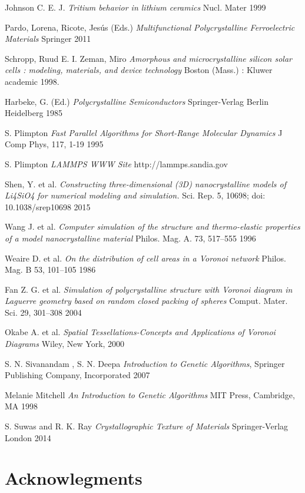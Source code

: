\documentclass{article}
\begin{document}
\begin{thebibliography}{9}

  Johnson C. E. J.
  \textit{Tritium behavior in lithium ceramics}
  Nucl. Mater
  1999

  Pardo, Lorena, Ricote, Jesús (Eds.)
  \textit{Multifunctional Polycrystalline Ferroelectric Materials}
  Springer
  2011

  Schropp, Ruud E. I. Zeman, Miro
  \textit{Amorphous and microcrystalline silicon solar cells : modeling, materials, and device technology}
  Boston (Mass.) : Kluwer academic
  1998.

   Harbeke, G. (Ed.)
  \textit{Polycrystalline Semiconductors}
  Springer-Verlag Berlin Heidelberg
  1985

   S. Plimpton 
  \textit{Fast Parallel Algorithms for Short-Range Molecular Dynamics}
  J Comp Phys, 117, 1-19
  1995

   S. Plimpton 
  \textit{LAMMPS WWW Site}
  http://lammps.sandia.gov

  Shen, Y. et al. 
  \textit{Constructing three-dimensional (3D) nanocrystalline models of Li4SiO4 for numerical modeling and simulation.}
  Sci. Rep. 5, 10698; doi: 10.1038/srep10698 
  2015

  Wang J. et al. 
  \textit{Computer simulation of the structure and thermo-elastic properties of a model nanocrystalline material}
  Philos. Mag. A. 73, 517–555 
  1996

  Weaire D. et al. 
  \textit{On the distribution of cell areas in a Voronoi network}
  Philos. Mag. B 53, 101–105 
  1986

  Fan Z. G. et al. 
  \textit{Simulation of polycrystalline structure with Voronoi diagram in Laguerre geometry    based on random closed packing of spheres} 
  Comput. Mater. Sci. 29, 301–308 
  2004

Okabe A. et al. 
\textit{Spatial Tessellations-Concepts and Applications of Voronoi Diagrams}
Wiley, New York, 
2000

  S. N. Sivanandam , S. N. Deepa
  \textit{Introduction to Genetic Algorithms},
  Springer Publishing Company, Incorporated
  2007

  Melanie Mitchell
  \textit{An Introduction to Genetic Algorithms}
  MIT Press, Cambridge, MA
 1998

  S. Suwas and R. K. Ray
  \textit{Crystallographic Texture of Materials}
  Springer-Verlag London 
  2014

\end{thebibliography}


\section{Acknowlegments}
\end{document}
